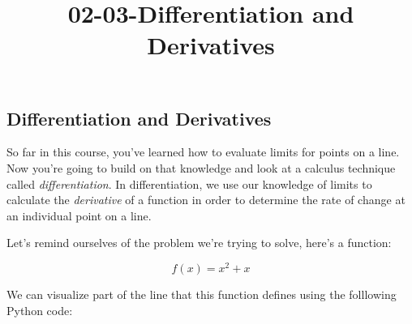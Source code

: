 \documentclass[11pt]{article}
\title{02-03-Differentiation and Derivatives}
\begin{document}
    
    
    \maketitle
    
    

    
    \subsection{Differentiation and
Derivatives}\label{differentiation-and-derivatives}

So far in this course, you've learned how to evaluate limits for points
on a line. Now you're going to build on that knowledge and look at a
calculus technique called \emph{differentiation}. In differentiation, we
use our knowledge of limits to calculate the \emph{derivative} of a
function in order to determine the rate of change at an individual point
on a line.

Let's remind ourselves of the problem we're trying to solve, here's a
function:

\begin{equation}f(x) = x^{2} + x\end{equation}

We can visualize part of the line that this function defines using the
folllowing Python code:
\end{document}

